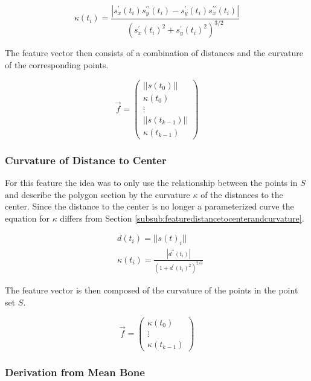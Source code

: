 \documentclass[pdftex,12pt,a4paper]{report}
\begin{document}
\begin{equation}
\kappa(t_i) = \frac{|s_x^\prime(t_i) s_y^{\prime\prime}(t_i) - s_y^\prime(t_i) s_x^{\prime\prime}(t_i)|}{(s_x^\prime(t_i)^2 + s_y^{\prime}(t_i)^2)^{3/2}}
\end{equation}

The feature vector then consists of a combination of distances and the curvature of the
corresponding points.

\begin{equation}
\vec{f} = \left( \begin{array}{c}
||s(t_0)|| \\
\kappa(t_0) \\
\vdots \\
||s(t_{k-1})|| \\
\kappa(t_{k-1})
\end{array} \right)
\end{equation}

\subsubsection{Curvature of Distance to Center}

For this feature the idea was to only use the relationship between the points in $S$ and describe
the polygon section by the curvature $\kappa$ of the distances to the center. Since the distance 
to the center is no longer a parameterized curve the equation for $\kappa$ differs from
Section \ref{subsub:featuredistancetocenterandcurvature}.

\begin{equation}
\begin{split}
& d(t_i) = ||s(t)_i|| \\
& \kappa(t_i) = \frac{|d^{\prime\prime}(t_i)|}{(1 + d^\prime(t_i)^2)^{2/3}}
\end{split}
\end{equation}

The feature vector is then composed of the curvature of the points in the point set $S$.

\begin{equation}
\vec{f} = \left( \begin{array}{c}
\kappa(t_0) \\
\vdots \\
\kappa(t_{k-1})
\end{array} \right)
\end{equation}

\subsubsection{Derivation from Mean Bone}
\end{document}
